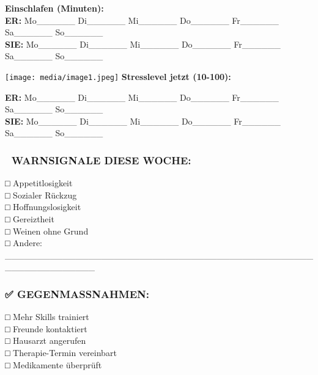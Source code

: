 \textbf{Einschlafen (Minuten):}\\
\textbf{ER:} Mo\_\_\_\_\_\_ Di\_\_\_\_\_\_ Mi\_\_\_\_\_\_ Do\_\_\_\_\_\_ Fr\_\_\_\_\_\_ Sa\_\_\_\_\_\_ So\_\_\_\_\_\_\\
\textbf{SIE:} Mo\_\_\_\_\_\_ Di\_\_\_\_\_\_ Mi\_\_\_\_\_\_ Do\_\_\_\_\_\_ Fr\_\_\_\_\_\_ Sa\_\_\_\_\_\_ So\_\_\_\_\_\_

\texttt{[image: media/image1.jpeg]} \textbf{Stresslevel jetzt (10-100):}

\textbf{ER:} Mo\_\_\_\_\_\_ Di\_\_\_\_\_\_ Mi\_\_\_\_\_\_ Do\_\_\_\_\_\_ Fr\_\_\_\_\_\_ Sa\_\_\_\_\_\_ So\_\_\_\_\_\_\\
\textbf{SIE:} Mo\_\_\_\_\_\_ Di\_\_\_\_\_\_ Mi\_\_\_\_\_\_ Do\_\_\_\_\_\_ Fr\_\_\_\_\_\_ Sa\_\_\_\_\_\_ So\_\_\_\_\_\_

\hypertarget{section-8}{%
\subsubsection{}\label{section-8}}

\hypertarget{section-9}{%
\subsubsection{}\label{section-9}}

\hypertarget{warnsignale-diese-woche}{%
\subsubsection{\texorpdfstring{\textbf{🚨 WARNSIGNALE DIESE WOCHE:}}{🚨 WARNSIGNALE DIESE WOCHE:}}\label{warnsignale-diese-woche}}

□ Appetitlosigkeit\\
□ Sozialer Rückzug\\
□ Hoffnungslosigkeit\\
□ Gereiztheit\\
□ Weinen ohne Grund\\
□ Andere: \_\_\_\_\_\_\_\_\_\_\_\_\_\_\_\_\_\_\_\_\_\_\_\_\_\_\_\_\_\_\_\_\_\_\_\_\_\_\_\_\_\_\_\_\_\_\_\_\_\_\_\_\_\_\_\_\_\_\_\_\_\_

\hypertarget{gegenmassnahmen}{%
\subsubsection{\texorpdfstring{\textbf{✅ GEGENMASSNAHMEN:}}{✅ GEGENMASSNAHMEN:}}\label{gegenmassnahmen}}

□ Mehr Skills trainiert\\
□ Freunde kontaktiert\\
□ Hausarzt angerufen\\
□ Therapie-Termin vereinbart\\
□ Medikamente überprüft


